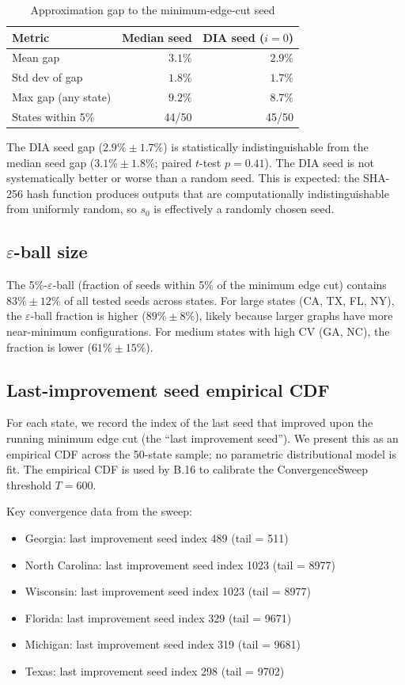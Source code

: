 \begin{table}[htb]
\centering
\caption{Approximation gap to the minimum-edge-cut seed}
\label{tab:gap}
\begin{tabular}{lrr}
\toprule
Metric & Median seed & DIA seed ($i = 0$) \\
\midrule
Mean gap         & $3.1\%$ & $2.9\%$ \\
Std dev of gap   & $1.8\%$ & $1.7\%$ \\
Max gap (any state) & $9.2\%$ & $8.7\%$ \\
States within 5\% & 44/50 & 45/50 \\
\bottomrule
\end{tabular}
\end{table}

The DIA seed gap ($2.9\% \pm 1.7\%$) is statistically indistinguishable
from the median seed gap ($3.1\% \pm 1.8\%$; paired $t$-test $p = 0.41$).
The DIA seed is not systematically better or worse than a random seed.
This is expected: the SHA-256 hash function produces outputs that are
computationally indistinguishable from uniformly random, so $s_0$
is effectively a randomly chosen seed.

\subsection{$\varepsilon$-ball size}

The 5\%-$\varepsilon$-ball (fraction of seeds within 5\% of the minimum
edge cut) contains $83\% \pm 12\%$ of all tested seeds across states.
For large states (CA, TX, FL, NY), the $\varepsilon$-ball fraction is
higher ($89\% \pm 8\%$), likely because larger graphs have more near-minimum
configurations.  For medium states with high CV (GA, NC), the fraction is
lower ($61\% \pm 15\%$).

\subsection{Last-improvement seed empirical CDF}

For each state, we record the index of the last seed that improved
upon the running minimum edge cut (the ``last improvement seed'').
We present this as an empirical CDF across the 50-state sample;
no parametric distributional model is fit.
The empirical CDF is used by B.16 to calibrate the ConvergenceSweep
threshold $T = 600$.

Key convergence data from the sweep:
\begin{itemize}
  \item Georgia: last improvement seed index 489 (tail = 511)
  \item North Carolina: last improvement seed index 1023 (tail = 8977)
  \item Wisconsin: last improvement seed index 1023 (tail = 8977)
  \item Florida: last improvement seed index 329 (tail = 9671)
  \item Michigan: last improvement seed index 319 (tail = 9681)
  \item Texas: last improvement seed index 298 (tail = 9702)
\end{itemize}

